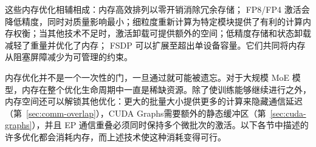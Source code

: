 这些内存优化相辅相成：内存高效排列以零开销消除冗余存储； FP8/FP4 激活会降低精度，同时对质量影响最小；细粒度重新计算为特定模块提供了有利的计算内存权衡；当其他技术不足时，激活卸载可提供额外的空间；低精度存储和状态卸载减轻了重量并优化了内存； FSDP 可以扩展至超出单设备容量。它们共同将内存从阻塞屏障减少为可管理的约束。

内存优化并不是一个一次性的门，一旦通过就可能被遗忘。对于大规模 MoE 模型，内存在整个优化生命周期中一直是稀缺资源。除了使训练能够继续进行之外，内存空间还可以解锁其他优化：更大的批量大小提供更多的计算来隐藏通信延迟（第~\ref{sec:comm-overlap}），CUDA Graphs需要额外的静态缓冲区（第~\ref{sec:cuda-graphs}），并且 EP 通信重叠必须同时保持多个微批次的激活。以下各节中描述的许多优化都会消耗内存，而上述技术使这种消耗变得可行。

